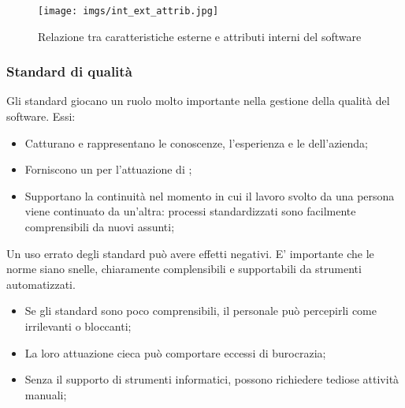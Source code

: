 \begin{figure}[h]
  \centering
  \texttt{[image: imgs/int\_ext\_attrib.jpg]}
  \caption{Relazione tra caratteristiche esterne e attributi interni del
    software}
\end{figure}

\subsubsection{Standard di qualità}

Gli standard giocano un ruolo molto importante nella gestione della qualità del
software. Essi:

\begin{itemize}
  \item Catturano e rappresentano le conoscenze, l'esperienza e le
     dell'azienda;
  \item Forniscono un  per l'attuazione di ;
  \item Supportano la continuità nel momento in cui il lavoro svolto da una
    persona viene continuato da un'altra: processi standardizzati sono
    facilmente comprensibili da nuovi assunti;
\end{itemize}

Un uso errato degli standard può avere effetti negativi. E' importante che le
norme siano snelle, chiaramente complensibili e supportabili da strumenti
automatizzati.

\begin{itemize}
  \item Se gli standard sono poco comprensibili, il personale può percepirli
    come irrilevanti o bloccanti;
  \item La loro attuazione cieca può comportare eccessi di burocrazia;
  \item Senza il supporto di strumenti informatici, possono richiedere tediose
    attività manuali;
\end{itemize}

